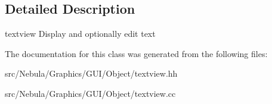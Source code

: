 \subsection{\-Detailed \-Description}
textview \-Display and optionally edit text 

\-The documentation for this class was generated from the following files\-:\begin{DoxyCompactItemize}
\item 
src/\-Nebula/\-Graphics/\-G\-U\-I/\-Object/textview.\-hh\item 
src/\-Nebula/\-Graphics/\-G\-U\-I/\-Object/textview.\-cc\end{DoxyCompactItemize}
